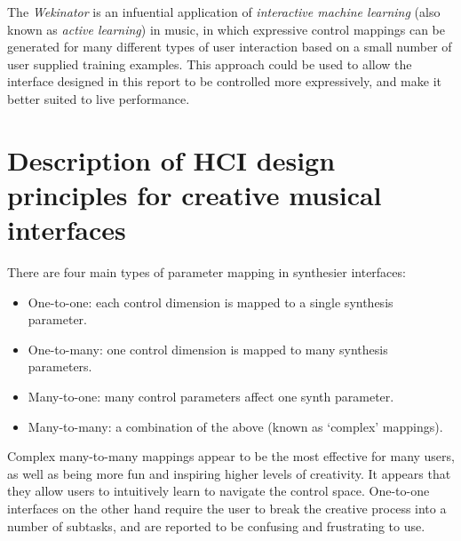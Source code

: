 \documentclass[11pt, oneside]{report}   	%
\begin{document}
The \emph{Wekinator} \cite{Wekinator} is an infuential application of \emph{interactive machine learning} (also known as \emph{active learning}) in music, in which expressive control mappings can be generated for many different types of user interaction based on a small number of user supplied training examples. This approach could be used to allow the interface designed in this report to be controlled more expressively, and make it better suited to live performance.
\section{Description of HCI design principles for creative musical interfaces}\label{sec:Tubb}
There are four main types of parameter mapping in synthesier interfaces:\cite{MappingStrategies}
\begin{itemize}
\vspace{-10pt}
\setlength\itemsep{-1.2em}
\item One-to-one: each control dimension is mapped to a single synthesis parameter.
\item One-to-many: one control dimension is mapped to many synthesis parameters.
\item Many-to-one: many control parameters affect one synth parameter.
\item Many-to-many: a combination of the above (known as ‘complex’ mappings).
\end{itemize}
\vspace{-10pt}
Complex many-to-many mappings appear to be the most effective for many users, as well as being more fun and inspiring higher levels of creativity. It appears that they allow users to intuitively learn to navigate the control space. One-to-one interfaces on the other hand require the user to break the creative process into a number of subtasks, and are reported to be confusing and frustrating to use.
\end{document}
